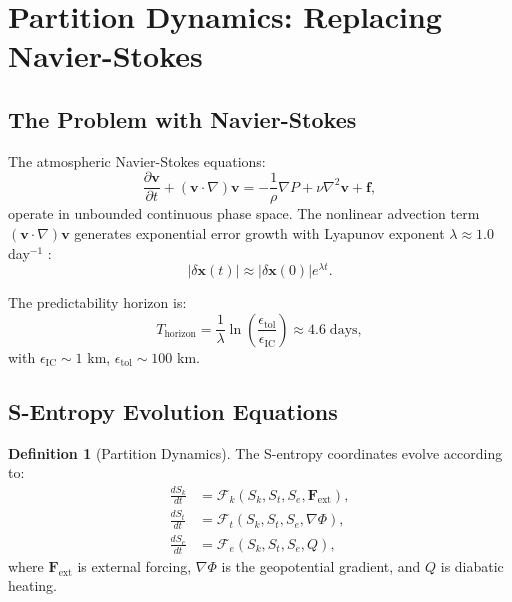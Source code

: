 \documentclass[twocolumn,10pt]{article}
\theoremstyle{definition}
\newtheorem{definition}[theorem]{Definition}
\newcommand{\Sk}{S_k}
\newcommand{\St}{S_t}
\newcommand{\Se}{S_e}
\begin{document}
\section{Partition Dynamics: Replacing Navier-Stokes}\label{sec:partition_dynamics}

\subsection{The Problem with Navier-Stokes}

The atmospheric Navier-Stokes equations:
\begin{equation}\label{eq:navier_stokes}
    \frac{\partial\mathbf{v}}{\partial t} + (\mathbf{v}\cdot\nabla)\mathbf{v} = -\frac{1}{\rho}\nabla P + \nu\nabla^2\mathbf{v} + \mathbf{f},
\end{equation}
operate in unbounded continuous phase space. The nonlinear advection term $(\mathbf{v}\cdot\nabla)\mathbf{v}$ generates exponential error growth with Lyapunov exponent $\lambda \approx 1.0$ day$^{-1}$ \citep{Lorenz1963}:
\begin{equation}\label{eq:error_growth}
    |\delta\mathbf{x}(t)| \approx |\delta\mathbf{x}(0)|e^{\lambda t}.
\end{equation}

The predictability horizon is:
\begin{equation}\label{eq:lorenz_limit}
    T_{\mathrm{horizon}} = \frac{1}{\lambda}\ln\left(\frac{\epsilon_{\mathrm{tol}}}{\epsilon_{\mathrm{IC}}}\right) \approx 4.6\;\text{days},
\end{equation}
with $\epsilon_{\mathrm{IC}} \sim 1$ km, $\epsilon_{\mathrm{tol}} \sim 100$ km.

\subsection{S-Entropy Evolution Equations}

\begin{definition}[Partition Dynamics]\label{def:partition_dynamics}
The S-entropy coordinates evolve according to:
\begin{align}
    \frac{d\Sk}{dt} &= \mathcal{F}_k(\Sk, \St, \Se, \mathbf{F}_{\mathrm{ext}}), \label{eq:dSk} \\
    \frac{d\St}{dt} &= \mathcal{F}_t(\Sk, \St, \Se, \nabla\Phi), \label{eq:dSt} \\
    \frac{d\Se}{dt} &= \mathcal{F}_e(\Sk, \St, \Se, Q), \label{eq:dSe}
\end{align}
where $\mathbf{F}_{\mathrm{ext}}$ is external forcing, $\nabla\Phi$ is the geopotential gradient, and $Q$ is diabatic heating.
\end{definition}
\end{document}
